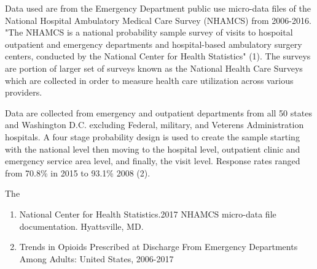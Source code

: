 


\let\counterwithout\relax
\let\counterwithin\relax
{}


Data used are from the Emergency Department public use micro-data files of the National Hospital Ambulatory Medical Care Survey (NHAMCS) from 2006-2016. "The NHAMCS is a national probability sample survey of visits to hospoital outpatient and emergency departments and hospital-based ambulatory surgery centers, conducted by the National Center for Health Statistics" (1). The surveys are portion of larger set of surveys known as the National Health Care Surveys which are collected in order to measure health care utilization across various providers.

Data are collected from emergency and outpatient departments from all 50 states and Washington D.C. excluding Federal, military, and Veterens Administration hospitals. A four stage probability design is used to create the sample starting with the national level then moving to the hospital level, outpatient clinic and emergency service area level, and finally, the visit level. Response rates ranged from 70.8\% in 2015 to 93.1\% 2008 (2).

The 


\begin{enumerate}
    \item National Center for Health Statistics.2017 NHAMCS micro-data file documentation. Hyattsville, MD.

    \item Trends in Opioids Prescribed at Discharge From Emergency Departments Among Adults: United States, 2006-2017
\end{enumerate}

